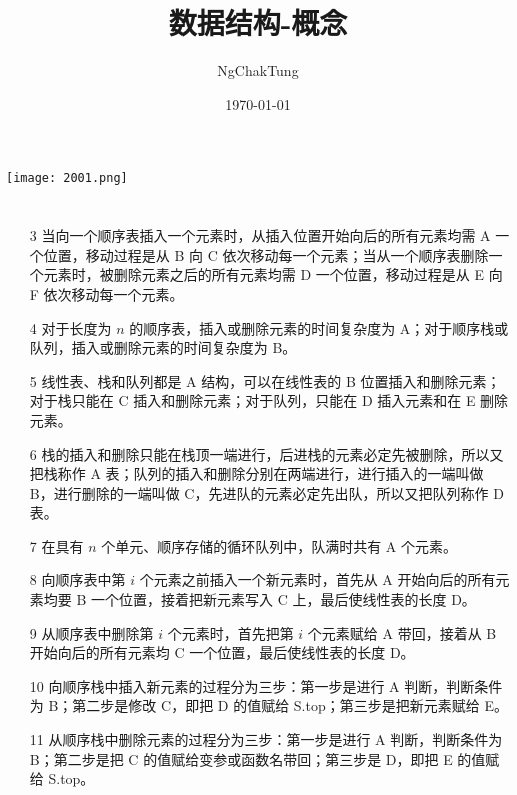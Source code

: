 \documentclass[UTF8]{ctexart}
\title{数据结构-概念}
\author{NgChakTung}
\date{\today}
\begin{document}
	\maketitle
	\centering
	\texttt{[image: 2001.png]}

\section{}
\begin{enumerate}
\item[3] 当向一个顺序表插入一个元素时，从插入位置开始向后的所有元素均需 A 一个位置，移动过程是从 B 向 C 依次移动每一个元素；当从一个顺序表删除一个元素时，被删除元素之后的所有元素均需 D 一个位置，移动过程是从 E 向 F 依次移动每一个元素。

\item[4] 对于长度为 $n$ 的顺序表，插入或删除元素的时间复杂度为 A；对于顺序栈或队列，插入或删除元素的时间复杂度为 B。

\item[5] 线性表、栈和队列都是 A 结构，可以在线性表的 B 位置插入和删除元素；对于栈只能在 C 插入和删除元素；对于队列，只能在 D 插入元素和在 E 删除元素。

\item[6] 栈的插入和删除只能在栈顶一端进行，后进栈的元素必定先被删除，所以又把栈称作 A 表；队列的插入和删除分别在两端进行，进行插入的一端叫做 B，进行删除的一端叫做 C，先进队的元素必定先出队，所以又把队列称作 D 表。

\item[7] 在具有 $n$ 个单元、顺序存储的循环队列中，队满时共有 A 个元素。

\item[8] 向顺序表中第 $i$ 个元素之前插入一个新元素时，首先从 A 开始向后的所有元素均要 B 一个位置，接着把新元素写入 C 上，最后使线性表的长度 D。

\item[9] 从顺序表中删除第 $i$ 个元素时，首先把第 $i$ 个元素赋给 A 带回，接着从 B 开始向后的所有元素均 C 一个位置，最后使线性表的长度 D。

\item[10] 向顺序栈中插入新元素的过程分为三步：第一步是进行 A 判断，判断条件为 B；第二步是修改 C，即把 D 的值赋给 S.top；第三步是把新元素赋给 E。

\item[11] 从顺序栈中删除元素的过程分为三步：第一步是进行 A 判断，判断条件为 B；第二步是把 C 的值赋给变参或函数名带回；第三步是 D，即把 E 的值赋给 S.top。


\end{enumerate}
\end{document}
